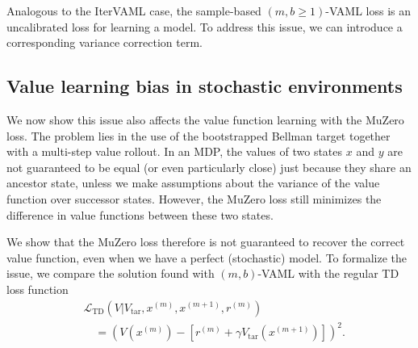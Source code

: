 Analogous to the IterVAML case, the sample-based $(m,b \geq 1)$-VAML loss is an uncalibrated loss for learning a model.
To address this issue, we can introduce a corresponding variance correction term.

\subsection{Value learning bias in stochastic environments}
\label{sec:cvaml:muzero_bias}

We now show this issue also affects the value function learning with the MuZero loss.
The problem lies in the use of the bootstrapped Bellman target together with a multi-step value rollout.
In an MDP, the values of two states $x$ and $y$ are not guaranteed to be equal (or even particularly close) just because they share an ancestor state, unless we make assumptions about the variance of the value function over successor states.
However, the MuZero loss still minimizes the difference in value functions between these two states.

We show that the MuZero loss therefore is not guaranteed to recover the correct value function, even when we have a perfect (stochastic) model.
To formalize the issue, we compare the solution found with $(m,b)$-VAML with the regular TD loss function
\begin{align}
    &\mathcal{L}_\mathrm{TD}(V|V_\mathrm{tar}, x^{(m)},x^{(m+1)},r^{(m)}) \nonumber\\
    &\quad=\left(V(x^{(m)}) - \left[r^{(m)} + \gamma V_\mathrm{tar}(x^{(m+1)})\right]\right)^2.
\end{align}


